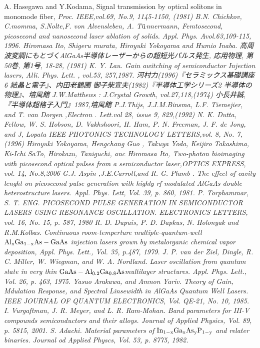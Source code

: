 \begin{thebibliography}{99}
 A. Hasegawa and Y.Kodama, Signal transmission by optical solitons in monomode fiber, \sl Proc. IEEE\rm ,vol.69, No.9, 1145-1150, (1981)
 B.N. Chichkov, C.momma, S.Nolte,F. von Alvensleben, A. T$\rm{\ddot{u}}$nnermann, Femtosecond, picosecond and nanosecond laser ablation of solids. \sl Appl. Phys. A\rm vol.63,109-115, 1996.
 Hiromasa Ito, Shigeru 
murata, Hiroyuki Yokoyama and Humio Inaba. 高周波変調にもとづくAlGaAs半導体レーザーからの超短光パルス発生, 応用物理, 第50巻, 第1号, 18-28, (1981)
 K. Y. Lau. Gain awitching of semiconductor Injection lasers, \sl Alli. Phys. Lett. \rm , vol.53, 257,1987.
河村力(1996)『セラミックス基礎講座6 結晶と電子』、内田老鶴圃
御子柴宣夫(1982)『半導体工学シリーズ2 半導体の物理』、培風館
 J.W.Matthews : J.Crystal Growth, vol.27,118,(1974)
小長井誠,『半導体超格子入門』1987,培風館
 P.J.Thijs, J.J.M.Binsma, L.F. Tiemejier, and T. van Dorgen ,\sl Electron . Lett.\rm vol 28, issue 9, 829,(1992)
N. K. Dutta, Fellow, W. S. Hobson, D. Vakhshoori, H. Ham, P. N. Freeman, J. F. de Jong, and J, Lopata \sl IEEE PHOTONICS TECHNOLOGY LETTERS\rm ,vol. 8, No. 7, (1996)
 Hiroyuki Yokoyama, Hengchang Guo , Takuya Yoda, Keijiro Takashima, Ki-Ichi SaTo, Hirokazu, Taniguchi, anc Hiromasa Ito, Two-photon bioimaging with picosecond optical pulses from a semiconductor laser,\sl OPTICS EXPRESS\rm , vol. 14, No.8,2006
 G.J. Aspin ,J.E.Carroll,and R. G. Plumb . The effect of cavity lenght on picosecond pulse generation with highly rf modulated AlGaAs double heterostructure lasers. \sl Appl. Phys. Lett\rm , Vol. 39, p. 860, 1981.
 P. Torphammar, S. T. ENG. PICOSECOND PULSE GENERATION IN SEMICONDUCTOR LASERS USING RESONANCE OSCILLATION. \sl ELECTRONICS LETTERS\rm , vol. 16, No. 15, p. 587, 1980 
 R. D. Dupuis, P. D. Dapkus, N. Holonyak and R.M.Kolbas. Continuous room-temperture multiple-quantum-well $\rm{Al_{x}Ga_{1-x}As-GaAs}$ injection lasers grown by metalorganic chemical vapor deposition, \sl  Appl. Phys. Lett.\rm , Vol. 35, p.487, 1979.
 J. P. van der Ziel, Dingle, R. C. Miller, W. Wiegman, and W. A. Nordland. Laser oscillation from quantum state in very thin $\rm{GaAs-Al_{0.2}Ga_{0.8}As }$multilayer structures. \sl Appl. Phys. Lett.\rm , Vol. 26,  p. 463, 1975. 
 Yasuo Arakawa, and Amnon Yariv. Theory of Gain, Mdulation Response, and Spectral Linsewidth in AlGaAs Quantum Well Lasers. \sl IEEE JOURNAL OF QUANTUM ELECTRONICS\rm , Vol. QE-21, No. 10, 1985.
 I. Vurgaftman, J. R. Meyer, and L. R. Ram-Mohan. Band parameters for III-V compounds semiconductors and their alloys. \sl Journal of Applied Physics\rm , Vol. 89, p. 5815, 2001.
 S. Adachi. Material parameters of $\rm{In_{1-x}Ga_{x}As_{y}P_{1-y}}$ and relater binaries. \sl Journal od Applied Physcs\rm , Vol. 53, p. 8775, 1982.
\end{thebibliography}
